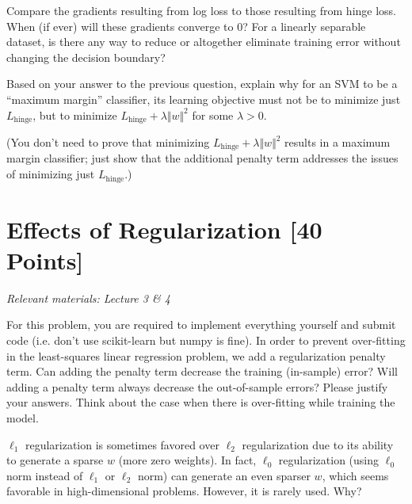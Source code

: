 \documentclass{article}
\begin{document}
\begin{solution}

\end{solution}

\problem[4]
Compare the gradients resulting from log loss to those resulting from hinge loss. When (if ever) will these gradients converge to 0? For a linearly separable dataset, is there any way to reduce or altogether eliminate training error without changing the decision boundary?

\begin{solution}

\end{solution}

\problem[5]
Based on your answer to the previous question, explain why for an SVM to be a ``maximum margin'' classifier, its learning objective must not be to minimize just $L_\text{hinge}$, but to minimize $L_\text{hinge} + \lambda\Vert w \Vert^2$ for some $\lambda > 0$.

(You don't need to prove that minimizing $L_\text{hinge} + \lambda\Vert w \Vert^2$ results in a maximum margin classifier; just show that the additional penalty term addresses the issues of minimizing just $L_\text{hinge}$.)

\begin{solution}

\end{solution}

\newpage
\section{Effects of Regularization [40 Points]}
\textit{Relevant materials: Lecture 3 \& 4}

For this problem, you are required to implement everything yourself and submit code (i.e. don't use scikit-learn but numpy is fine).
\indent\problem[4] 
In order to prevent over-fitting in the least-squares linear regression problem, we add a regularization penalty term.
Can adding the penalty term decrease the training (in-sample) error?
Will adding a penalty term always decrease the out-of-sample errors?
Please justify your answers. Think about the case when there is over-fitting while training the model.

\begin{solution}
 
\end{solution}

\problem[4]
$\ell_1$ regularization is sometimes favored over $\ell_2$ regularization due to its ability to generate a sparse $w$ (more zero weights).
In fact, $\ell_0$ regularization (using $\ell_0$ norm instead of $\ell_1$ or $\ell_2$ norm) can generate an even sparser $w$, which seems favorable in high-dimensional problems.
However, it is rarely used.  Why?
\end{document}
